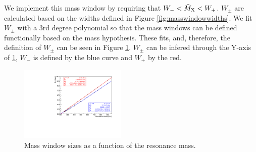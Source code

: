 We implement this mass window by requiring that $W_{-} < \tilde{M}_{\mathrm{X}} < W_{+}$. 
$W_{\pm}$ are calculated based on the widths defined in Figure \ref{fig:masswindowwidths}. 
We fit $W_{\pm}$ with a 3rd degree polynomial so that the mass windows can be defined functionally based on the mass hypothesis. 
These fits, and, therefore, the definition of $W_{\pm}$ can be seen in Figure \ref{fig:masswindowfit}. 
$W_{\pm}$ can be infered through the Y-axis of \ref{fig:masswindowfit}, $W_{-}$ is defined by the blue curve and $W_{+}$ by the red. 

\begin{figure}[thb]
  \centering
  \includegraphics[width=0.45\textwidth]{figures/sec-window/fit_60_prime.pdf}\hfil

  \caption{Mass window sizes as a function of the resonance mass. }
  \label{fig:masswindowfit}
\end{figure}

